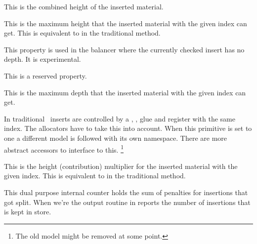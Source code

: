 \startnewprimitive[title={\prm {insertheights}}]

This is the combined height of the inserted material.

\stopnewprimitive

\startnewprimitive[title={\prm {insertlimit}}]

This is the maximum height that the inserted material with the given index can
get. This is equivalent to  in the traditional method.

\stopnewprimitive

\startnewprimitive[title={\prm {insertlinedepth}}]

This property is used in the balancer where the currently checked insert has no
depth. It is experimental.

\stopnewprimitive

\startnewprimitive[title={\prm {insertlineheight}}]

This is a reserved property.

\stopnewprimitive

\startnewprimitive[title={\prm {insertmaxdepth}}]

This is the maximum depth that the inserted material with the given index can
get.

\stopnewprimitive

\startnewprimitive[title={\prm {insertmode}}]

In traditional \TEX\ inserts are controlled by a , , \prm
{glue} and  register with the same index. The allocators have to take
this into account. When this primitive is set to one a different model is
followed with its own namespace. There are more abstract accessors to interface
to this. \footnote {The old model might be removed at some point.}

\stopnewprimitive

\startnewprimitive[title={\prm {insertmultiplier}}]

This is the height (contribution) multiplier for the inserted material with the
given index. This is equivalent to  in the traditional method.

\stopnewprimitive

\startoldprimitive[title={\prm {insertpenalties}}]

This dual purpose internal counter holds the sum of penalties for insertions that
got split. When we're the output routine in reports the number of insertions that
is kept in store.

